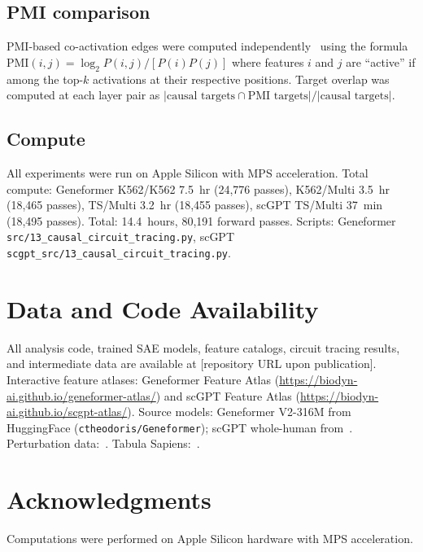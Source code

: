 \documentclass[onecolumn]{article}
\begin{document}
\subsection{PMI comparison}

PMI-based co-activation edges were computed independently~\citep{kendiukhov2025sae_atlas} using the formula $\text{PMI}(i,j) = \log_2 P(i,j) / [P(i) P(j)]$ where features $i$ and $j$ are ``active'' if among the top-$k$ activations at their respective positions. Target overlap was computed at each layer pair as $|\text{causal targets} \cap \text{PMI targets}| / |\text{causal targets}|$.

\subsection{Compute}

All experiments were run on Apple Silicon with MPS acceleration. Total compute: Geneformer K562/K562 7.5~hr (24,776 passes), K562/Multi 3.5~hr (18,465 passes), TS/Multi 3.2~hr (18,455 passes), scGPT TS/Multi 37~min (18,495 passes). Total: 14.4~hours, 80,191 forward passes. Scripts: Geneformer \texttt{src/13\_causal\_circuit\_tracing.py}, scGPT \texttt{scgpt\_src/13\_causal\_circuit\_tracing.py}.


\section*{Data and Code Availability}

All analysis code, trained SAE models, feature catalogs, circuit tracing results, and intermediate data are available at [repository URL upon publication]. Interactive feature atlases: Geneformer Feature Atlas (\url{https://biodyn-ai.github.io/geneformer-atlas/}) and scGPT Feature Atlas (\url{https://biodyn-ai.github.io/scgpt-atlas/}). Source models: Geneformer V2-316M from HuggingFace (\texttt{ctheodoris/Geneformer}); scGPT whole-human from~\citet{cui2024scgpt}. Perturbation data:~\citet{replogle2022mapping}. Tabula Sapiens:~\citet{tabula2022tabula}.


\section*{Acknowledgments}

Computations were performed on Apple Silicon hardware with MPS acceleration.



\end{document}
